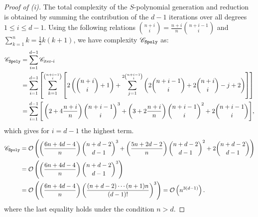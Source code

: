 \begin{proof}[Proof of  (i)]
The total complexity of the $S$-polynomial generation and reduction is obtained by summing the contribution of the $d-1$ iterations over all degrees $1\leq i \leq d-1$.
Using the following relations $\binom{n+i}{i} =\frac{n+i}{n}\binom{n+i-1}{i}$ and $\sum_{k=1}^n k = \frac{1}{2}k(k+1)$, we have complexity $\mathscr{C}_{\texttt{Spoly}}$ as:
\begin{align*}
    \mathscr{C}_{\texttt{Spoly}} 
    &= \sum_{i=1}^{d-1} \mathscr{C}_{\text{iter-}i} \\
    &= \sum_{i=1}^{d-1} \left[ \sum_{k=1}^{\binom{n+i-1}{i}} \left[ 2\left(\binom{n+i}{i}+1\right) + \sum_{j=1}^{2\binom{n+i-1}{i}} \left( 2\binom{n+i-1}{i} + 2\binom{n+i}{i} - j + 2 \right) \right] \right] \\
    &= \sum_{i=1}^{d-1} \Bigg[ \left(2 + 4\frac{n+i}{n}\right)\binom{n+i-1}{i}^3 + \left(3 + 2\frac{n+i}{n}\right)\binom{n+i-1}{i}^2 + 2\binom{n+i-1}{i} \Bigg],
\end{align*}
which gives for $i=d-1$ the highest term.
\begin{align*}
    \mathscr{C}_{\texttt{Spoly}} 
    &= \mathcal{O}\left( \left(\frac{6n+4d-4}{n}\right)\binom{n+d-2}{d-1}^3 + \left( \frac{5n+2d-2}{n}\right)\binom{n+d-2}{d-1}^2 + 2\binom{n+d-2}{d-1} \right) \\
    &= \mathcal{O}\left( \left(\frac{6n+4d-4}{n}\right)\binom{n+d-2}{d-1}^3 \right) \\
    &= \mathcal{O}\left( \left(\frac{6n+4d-4}{n}\right) {\left( \frac{(n+d-2)\cdots (n+1)n}{(d-1)!}\right)}^3 \right) = \mathcal{O}\left( n^{3(d-1)} \right).
\end{align*}
where the last equality holds under the condition $n > d$.
\end{proof}

